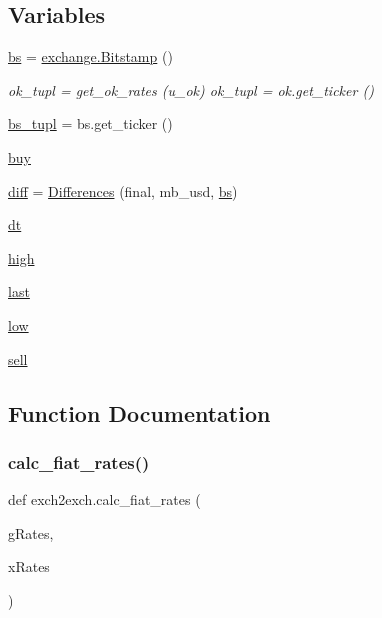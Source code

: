 \subsection*{Variables}
\begin{DoxyCompactItemize}
\item 
\hyperlink{namespaceexch2exch_a9cd4f02f37c459c12546f4552a54f5fc}{bs} = \hyperlink{classexchange_1_1_bitstamp}{exchange.\+Bitstamp} ()
\begin{DoxyCompactList}\small\item\em ok\+\_\+tupl = get\+\_\+ok\+\_\+rates (u\+\_\+ok) ok\+\_\+tupl = ok.\+get\+\_\+ticker () \end{DoxyCompactList}\item 
\hyperlink{namespaceexch2exch_a6e4164ccd0ea412356d0b9e4bbe35847}{bs\+\_\+tupl} = bs.\+get\+\_\+ticker ()
\item 
\hyperlink{namespaceexch2exch_ab7eb5c06d25fed3d99f5817c49fc2b30}{buy}
\item 
\hyperlink{namespaceexch2exch_a588ff4447b7d1ff41ea1d80c3d59005a}{diff} = \hyperlink{classexch2exch_1_1_differences}{Differences} (final, mb\+\_\+usd, \hyperlink{namespaceexch2exch_a9cd4f02f37c459c12546f4552a54f5fc}{bs})
\item 
\hyperlink{namespaceexch2exch_ab2b0f5888343e46aef72751a4be48b71}{dt}
\item 
\hyperlink{namespaceexch2exch_ace0a1a9df842ce16d0f0d7da40f6c1a4}{high}
\item 
\hyperlink{namespaceexch2exch_add3246fb611f3a6c35f10498f21c10ba}{last}
\item 
\hyperlink{namespaceexch2exch_a4ac63aa243bfdafff14b150c675ad9bc}{low}
\item 
\hyperlink{namespaceexch2exch_a66d338f409060f7cbcb49da894f5c3e4}{sell}
\end{DoxyCompactItemize}


\subsection{Function Documentation}
\mbox{\label{namespaceexch2exch_a2f3337121882596d0644f2d48ffb870c}} 
\subsubsection{\texorpdfstring{calc\+\_\+fiat\+\_\+rates()}{calc\_fiat\_rates()}}
{\footnotesize\ttfamily def exch2exch.\+calc\+\_\+fiat\+\_\+rates (\begin{DoxyParamCaption}\item[{}]{g\+Rates,  }\item[{}]{x\+Rates }\end{DoxyParamCaption})}



